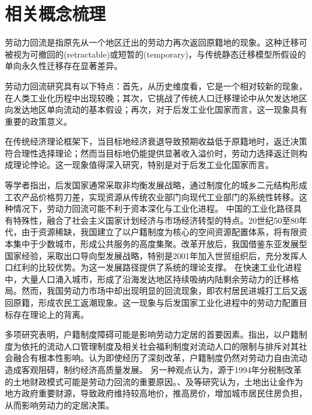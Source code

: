 \documentclass[
  a4paper,
  zihao=-4,
  fontset=mac,
  AutoFakeBold,
  AutoFakeSlant,
  oneside]{ctexbook}
\begin{document}
\section{相关概念梳理}
劳动力回流是指原先从一个地区迁出的劳动力再次返回原籍地的现象。这种迁移可被视为可撤回的(retractable)或短暂的(temporary)，与传统静态迁移模型所假设的单向永久性迁移存在显著差异。

劳动力回流研究具有以下特点：首先，从历史维度看，它是一个相对较新的现象，在人类工业化历程中出现较晚；其次，它挑战了传统人口迁移理论中从欠发达地区向发达地区单向流动的基本假设；再次，对于后发工业化国家而言，这一现象具有重要的政策意义。

在传统经济理论框架下，当目标地经济衰退导致预期收益低于原籍地时，返迁决策符合理性选择理论；然而当目标地仍能提供显著收入溢价时，劳动力选择返迁则构成理论悖论。这一现象值得深入研究，特别是对于后发工业化国家而言。

\textcite{CaiFangHuJiZhiDuYuLaoDongLiShiChangBaoHu2001}等学者指出，后发国家通常采取非均衡发展战略，通过制度化的城乡二元结构形成工农产品价格剪刀差，实现资源从传统农业部门向现代工业部门的系统性转移。这种情况下，劳动力回流可能不利于资本深化与工业化进程。
中国的工业化路径具有特殊性，融合了社会主义国家计划经济与市场经济转型的特点。20世纪50至80年代，由于资源稀缺，我国建立了以户籍制度为核心的空间资源配置体系，将有限资本集中于少数城市，形成公共服务的高度集聚。改革开放后，我国借鉴东亚发展型国家经验，采取出口导向型发展战略，特别是2001年加入世贸组织后，充分发挥人口红利的比较优势。\textcite{LinYiFuZhongGuoDeJingJiFaZhanZhanLueYuDiQuShouRuChaiJu2003}为这一发展路径提供了系统的理论支撑。
在快速工业化进程中，大量人口涌入城市，形成了沿海发达地区持续吸纳内陆剩余劳动力的迁移格局。然而，我国劳动力市场中却出现明显的回流现象，即农村居民进城打工后又返回原籍，形成农民工返潮现象。这一现象与后发国家工业化进程中的劳动力配置目标存在理论上的背离。

多项研究表明，户籍制度障碍可能是影响劳动力定居的首要因素。\textcite{RenYuanChengShiLiuDongRenKouDeSheHuiRongHeWenXianShuPing2006}指出，以户籍制度为依托的流动人口管理制度及相关社会福利制度对流动人口的限制与排斥对其社会融合有根本性影响。\textcite{LuYiLongHuKouHuanQiZuoYongMaHuJiZhiDuYuSheHuiFenCengHeLiuDong2008}认为即使经历了深刻改革，户籍制度仍然对劳动力自由流动造成客观阻碍，制约经济高质量发展。
另一种观点认为，源于1994年分税制改革的土地财政模式可能是劳动力回流的重要原因。\textcite{ChenYingFangNongMinGongZhiDuAnPaiYuShenFenRenTong2005}、\textcite{niehuihuaZhongguogaofangjiadexinzhengzhijingjixuejieshiYiZhengqihemou2013}及\textcite{YuJianXingDiFangFaZhanXingZhengFuDeXingWeiLuoJiJiZhiDuJiChu2012}等研究认为，土地出让金作为地方政府重要财源，导致政府维持较高地价，推高房价，增加城市居民住房负担，从而影响劳动力的定居决策。
\end{document}
